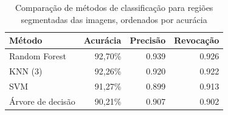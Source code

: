 
\begin{table}[h]
\ABNTEXfontereduzida
\centering
	\begin{tabulary}{\linewidth}{|L|R|R|R|}
		\hline
		\textbf{Método} & \textbf{Acurácia} & \textbf{Precisão} & \textbf{Revocação} \\ \hline
		Random Forest     & 92,70\% & 0.939 & 0.926 \\ \hline
		KNN (3)           & 92,26\% & 0.920 & 0.922 \\ \hline
		SVM               & 91,27\% & 0.899 & 0.913 \\ \hline
		Árvore de decisão & 90,21\% & 0.907 & 0.902 \\ \hline
	\end{tabulary}
\caption{Comparação de métodos de classificação para regiões segmentadas das imagens, ordenados por acurácia}
\label{tab:experimentoClassificacao1}
\end{table}
%
%

%
%
%
%
%
